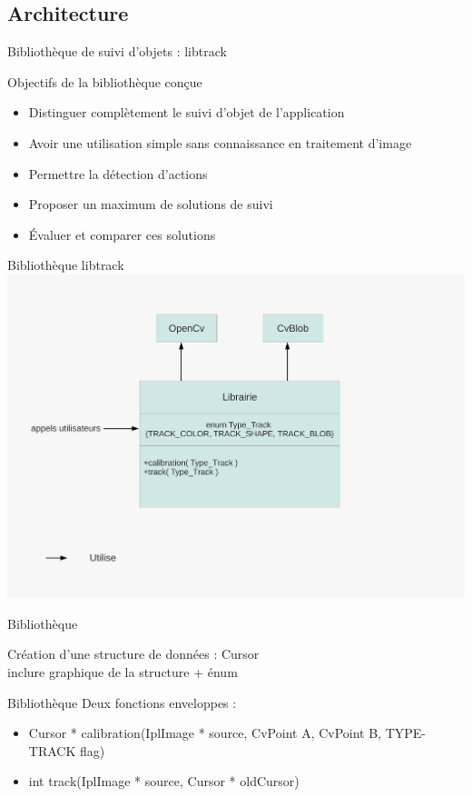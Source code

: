 \documentclass{beamer}
\begin{document}
		\subsection{Architecture}
		\begin{frame}{Bibliothèque de suivi d'objets : libtrack}
			\begin{block}{Objectifs de la bibliothèque conçue}
				\begin{itemize}
				\item{Distinguer complètement le suivi d'objet de l'application}
				\item{Avoir une utilisation simple sans connaissance en traitement d'image}
				\item{Permettre la détection d'actions}
				\item{Proposer un maximum de solutions de suivi}
				\item{Évaluer et comparer ces solutions}
				\end{itemize}
			\end{block}
		\end{frame}

		\begin{frame}{Bibliothèque libtrack}
			\includegraphics[scale=0.40]{schema-librairie.pdf}
		\end{frame}

		\begin{frame}{Bibliothèque}

		Création d'une structure de données : Cursor\\
    inclure graphique de la structure + énum
		\end{frame}
		
		\begin{frame}{Bibliothèque}
		Deux fonctions enveloppes : \\
			\begin{itemize}
				\item{Cursor * calibration(IplImage * source, CvPoint A, CvPoint B, TYPE-TRACK flag)}
				\item{int track(IplImage * source, Cursor * oldCursor)}
			\end{itemize}		
		\end{frame}
\end{document}
